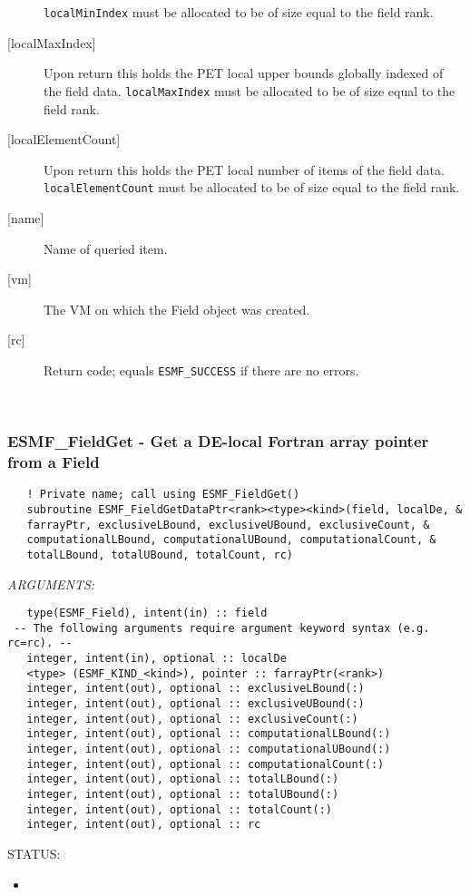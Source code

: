 \begin{description}
   {\tt localMinIndex} must be allocated to be of size equal to the field rank.
   \item[{[localMaxIndex]}]
   Upon return this holds the PET local upper bounds globally indexed of the field data.
   {\tt localMaxIndex} must be allocated to be of size equal to the field rank.
   \item[{[localElementCount]}]
   Upon return this holds the PET local number of items of the field data.
   {\tt localElementCount} must be allocated to be of size equal to the field rank.
   \item [{[name]}]
   Name of queried item.
   \item [{[vm]}]
   The VM on which the Field object was created.
   \item [{[rc]}]
   Return code; equals {\tt ESMF\_SUCCESS} if there are no errors.
   \end{description} 
 
\mbox{}\hrulefill\ 
 
\subsubsection [ESMF\_FieldGet] {ESMF\_FieldGet - Get a DE-local Fortran array pointer from a Field }


   
\begin{verbatim}   ! Private name; call using ESMF_FieldGet() 
   subroutine ESMF_FieldGetDataPtr<rank><type><kind>(field, localDe, & 
   farrayPtr, exclusiveLBound, exclusiveUBound, exclusiveCount, & 
   computationalLBound, computationalUBound, computationalCount, & 
   totalLBound, totalUBound, totalCount, rc) 
   \end{verbatim}{\em ARGUMENTS:}
\begin{verbatim}   type(ESMF_Field), intent(in) :: field 
 -- The following arguments require argument keyword syntax (e.g. rc=rc). --
   integer, intent(in), optional :: localDe 
   <type> (ESMF_KIND_<kind>), pointer :: farrayPtr(<rank>) 
   integer, intent(out), optional :: exclusiveLBound(:) 
   integer, intent(out), optional :: exclusiveUBound(:) 
   integer, intent(out), optional :: exclusiveCount(:) 
   integer, intent(out), optional :: computationalLBound(:) 
   integer, intent(out), optional :: computationalUBound(:) 
   integer, intent(out), optional :: computationalCount(:) 
   integer, intent(out), optional :: totalLBound(:) 
   integer, intent(out), optional :: totalUBound(:) 
   integer, intent(out), optional :: totalCount(:) 
   integer, intent(out), optional :: rc 
   \end{verbatim}
{\sf STATUS:}
   \begin{itemize} 
   \item{} 
   \end{itemize} 
   
